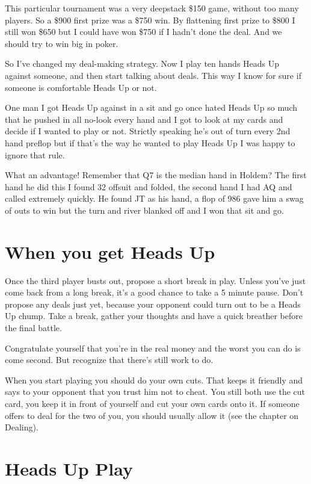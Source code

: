 This particular tournament was a very deepstack \$150
game, without too many players. So a \$900 first prize 
was a \$750 win. By flattening first prize to \$800 I still won \$650 but 
I could have won \$750 if I hadn't done the deal. And we should
try to win big in poker.

So I've changed my deal-making strategy. Now
I play ten hands Heads Up against someone,
and then start talking about deals. This way I know for sure if someone
is comfortable Heads Up or not.

One man I got Heads Up against in a sit and go once hated
Heads Up so much that he pushed in all no-look every hand and
I got to look at my cards and decide if I wanted to play or not.
Strictly speaking he's out of turn every 2nd hand preflop but
if that's the way he wanted to play Heads Up I was happy to
ignore that rule.

What an advantage! Remember that Q7 is the median hand in Holdem?
The first hand he did this I found 32 offsuit
and folded, the second hand I had AQ and called extremely quickly.
He found JT as his hand, a flop of 986 gave him a swag of
outs to win but the turn and river blanked off and
I won that sit and go.

\section{When you get Heads Up}

Once the third player busts out, propose a short
break in play. Unless you've just come back from
a long break, it's a good chance to take a 5 minute
pause. Don't propose any deals just yet, because
your opponent could turn out to be a Heads Up chump.
Take a break, gather your thoughts and have a quick
breather before the final battle.

Congratulate yourself that you're in the real money
and the worst you can do is come second. But
recognize that there's still work to do.

When you start playing you should do your own
cuts. That keeps it friendly and says to your
opponent that you trust him not to cheat. You
still both use the cut card, you keep it in
front of yourself and cut your own cards onto it.
If someone offers to deal for the two of you, you
should usually allow it (see the chapter on
Dealing).

\section{Heads Up Play}

